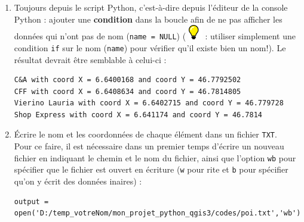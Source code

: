\documentclass[11pt]{article}
\begin{document}
\begin{enumerate}
\item Toujours depuis le script Python, c'est-à-dire depuis l'éditeur de la console Python : ajouter une \textbf{condition} dans la boucle afin de ne pas afficher les données qui n'ont pas de nom (\texttt{name = NULL}) ( \includegraphics[scale=1]{tip_l.png} \underline{}: utiliser simplement une condition \og{} \texttt{if}\fg{} sur le nom (\texttt{name}) pour vérifier qu'il existe bien un nom!). Le résultat devrait être semblable à celui-ci : 
\vspace*{-1em}
\begin{center}
\begin{minipage}[t]{0.76\textwidth}
\begin{verbatim}
C&A with coord X = 6.6400168 and coord Y = 46.7792502
CFF with coord X = 6.6408634 and coord Y = 46.7814805
Vierino Lauria with coord X = 6.6402715 and coord Y = 46.779728
Shop Express with coord X = 6.641174 and coord Y = 46.7814
\end{verbatim}
\end{minipage}
\end{center}
\vspace*{1em}


\item Écrire le nom et les coordonnées de chaque élément dans un fichier \texttt{TXT}.\\

Pour ce faire, il est nécessaire dans un premier temps d'écrire un nouveau fichier en indiquant le chemin et le nom du fichier, ainsi que l'option \og{}\texttt{wb}\fg{} pour spécifier que le fichier est ouvert en écriture (\texttt{w} pour \underline{}rite et \texttt{b} pour spécifier qu'on y écrit des données \underline{}inaires) : 
\vspace*{-1em}
\begin{center}
\begin{minipage}[t]{0.88\textwidth}
\begin{verbatim}
output = open('D:/temp_votreNom/mon_projet_python_qgis3/codes/poi.txt','wb')
\end{verbatim}
\end{minipage}
\end{center}
\vspace*{1em}


\end{enumerate}
\end{document}
